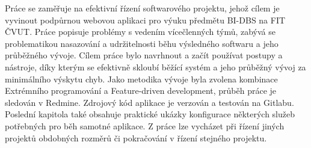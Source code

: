 Práce se zaměřuje na efektivní řízení softwarového projektu, jehož cílem je vyvinout podpůrnou webovou aplikaci pro výuku předmětu BI-DBS na FIT ČVUT. Práce popisuje problémy s vedením vícečlenných týmů, zabývá se problematikou nasazování a udržitelnosti běhu výsledného softwaru a jeho průběžného vývoje. Cílem práce bylo navrhnout a začít používat postupy a nástroje, díky kterým se efektivně skloubí běžící systém a jeho průběžný vývoj za minimálního výskytu chyb. Jako metodika vývoje byla zvolena kombinace Extrémního programování a Feature-driven development, průběh práce je sledován v Redmine. Zdrojový kód aplikace je verzován a testován na Gitlabu. Poslední kapitola také obsahuje praktické ukázky konfigurace některých služeb potřebných pro běh samotné aplikace. Z práce lze vycházet při řízení jiných projektů obdobných rozměrů či pokračování v řízení stejného projektu.